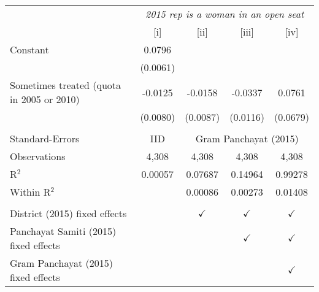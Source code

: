 
\begingroup
\centering
\begin{tabular}{lcccc}
   \toprule
    & \multicolumn{4}{c}{\textit{2015 rep is a woman in an open seat}}\\
                                             & [i]      & [ii]          & [iii]         & [iv]\\  
   \midrule 
   Constant                                  & 0.0796   &               &               &   \\   
                                             & (0.0061) &               &               &   \\   
   Sometimes treated (quota in 2005 or 2010) & -0.0125  & -0.0158       & -0.0337       & 0.0761\\   
                                             & (0.0080) & (0.0087)      & (0.0116)      & (0.0679)\\   
    \\
   Standard-Errors & IID & \multicolumn{3}{c}{Gram Panchayat (2015)} \\ 
   Observations                              & 4,308    & 4,308         & 4,308         & 4,308\\  
   R$^2$                                     & 0.00057  & 0.07687       & 0.14964       & 0.99278\\  
   Within R$^2$                              &          & 0.00086       & 0.00273       & 0.01408\\  
    \\
   District (2015) fixed effects             &          & $\checkmark$  & $\checkmark$  & $\checkmark$\\   
   Panchayat Samiti (2015) fixed effects     &          &               & $\checkmark$  & $\checkmark$\\   
   Gram Panchayat (2015) fixed effects       &          &               &               & $\checkmark$\\   
   \bottomrule
\end{tabular}
\par\endgroup


